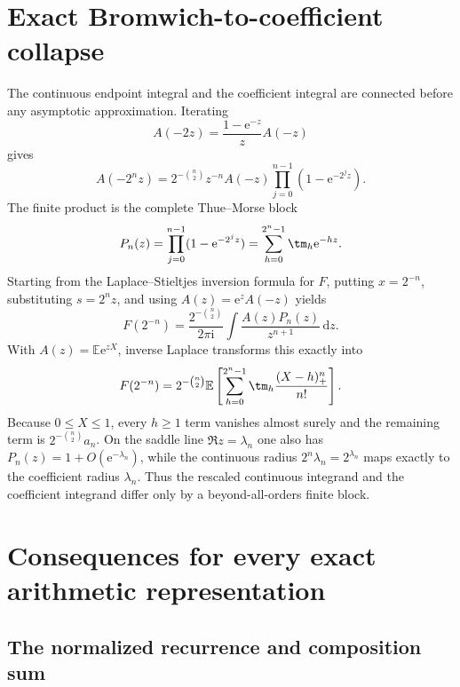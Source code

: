 \documentclass[11pt,oneside]{article}
\theoremstyle{definition}
\theoremstyle{remark}
\newcommand{\e}{\mathrm e}
\newcommand{\ii}{\mathrm i}
\newcommand{\dd}{\,\mathrm d}
\newcommand{\E}{\mathbb E}
\begin{document}
\section{Exact Bromwich-to-coefficient collapse}
\label{dyadicasym:sec:bromwich-collapse}

The continuous endpoint integral and the coefficient integral are connected before any
asymptotic approximation.  Iterating
\begin{equation}
 A(-2z)=\frac{1-\e^{-z}}zA(-z)
 \label{dyadicasym:eq:negative-refinement}
\end{equation}
gives
\begin{equation}
 A(-2^nz)=2^{-\binom n2}z^{-n}A(-z)
 \prod_{j=0}^{n-1}(1-\e^{-2^jz}).
 \label{dyadicasym:eq:negative-refinement-iterated}
\end{equation}
The finite product is the complete Thue--Morse block
\begin{equation}
 P_n(z)=\prod_{j=0}^{n-1}(1-\e^{-2^jz})
 =\sum_{h=0}^{2^n-1}\tm_h\e^{-hz}.
 \label{dyadicasym:eq:Bromwich-TM-product}
\end{equation}
Starting from the Laplace--Stieltjes inversion formula for $F$, putting
$x=2^{-n}$, substituting $s=2^nz$, and using $A(z)=\e^zA(-z)$ yields
\begin{equation}
 F(2^{-n})=\frac{2^{-\binom n2}}{2\pi\ii}
 \int\frac{A(z)P_n(z)}{z^{n+1}}\dd z.
 \label{dyadicasym:eq:Bromwich-rescaled}
\end{equation}
With $A(z)=\E\e^{zX}$, inverse Laplace transforms this exactly into
\begin{equation}
 F(2^{-n})=2^{-\binom n2}\E\left[
 \sum_{h=0}^{2^n-1}\tm_h\frac{(X-h)_+^n}{n!}\right].
 \label{dyadicasym:eq:positive-part-collapse}
\end{equation}
Because $0\le X\le1$, every $h\ge1$ term vanishes almost surely and the remaining term is
$2^{-\binom n2}a_n$.  On the saddle line $\Re z=\lambda_n$ one also has
$P_n(z)=1+O(\e^{-\lambda_n})$, while the continuous radius
$2^n\lambda_n=2^{\lambda_n}$ maps exactly to the coefficient radius $\lambda_n$.
Thus the rescaled continuous integrand and the coefficient integrand differ only by a
beyond-all-orders finite block.

\section{Consequences for every exact arithmetic representation}
\label{dyadicasym:sec:corollaries}

\subsection{The normalized recurrence and composition sum}
\end{document}
